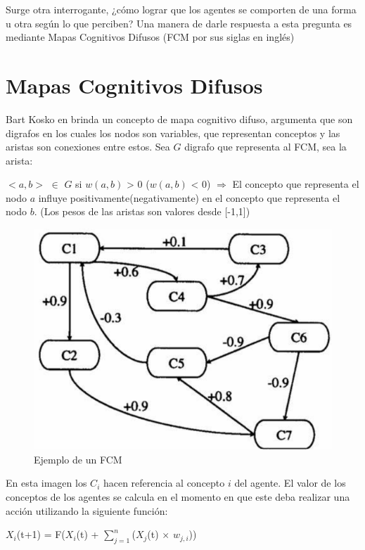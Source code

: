 Surge otra interrogante, ¿cómo lograr que los agentes se comporten de una forma u otra según lo que perciben? Una manera 
de darle respuesta a esta pregunta es mediante Mapas Cognitivos Difusos (FCM por sus siglas en inglés) 


\section{Mapas Cognitivos Difusos}
Bart Kosko en \autocite{Bart1986}
brinda un concepto de mapa cognitivo difuso, argumenta que son digrafos en los cuales los nodos son variables,
que representan conceptos y las aristas son conexiones entre estos. Sea $G$ digrafo que representa al FCM, 
sea la arista:
\begin{center}
    $<a,b>$ $\in$ $G$ si $w(a,b)$ > $0$  ($w(a,b)$ < $0$) $\Rightarrow$ El concepto que representa el nodo $a$ influye 
    positivamente(negativamente) en el concepto que representa el nodo $b$. (Los pesos de las aristas son valores desde 
    [-1,1])  
\end{center}
\begin{figure}[htb]
    \centering
    \includegraphics{Graphics/fcm_example.png}
    \caption{Ejemplo de un FCM}
\end{figure}

En esta imagen los $C_{i}$ hacen referencia al concepto $i$ del agente. El valor de los conceptos de los agentes se 
calcula en el momento en que este deba realizar una acción utilizando la siguiente función:
\begin{center}
    $X_{i}$(t+1) = F($X_{i}$(t) + $\sum_{j=1}^{n}${($X_{j}$(t) $\times$ $w_{j,i}$)})
\end{center}

